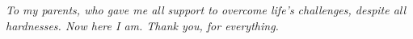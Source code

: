 \vspace*{\fill}
   \centering
   \noindent
   \textit{To my parents, who gave me all support to overcome life's challenges, despite all hardnesses. Now here I am. Thank you, for everything.} \vspace*{\fill}
